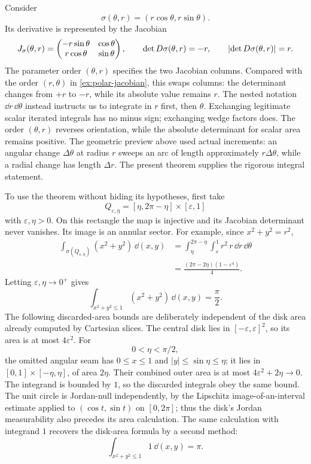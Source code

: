 \begin{example}
Consider
\[
\sigma(\theta,r)=(r\cos\theta,r\sin\theta).
\]
Its derivative is represented by the Jacobian
\[
J_\sigma(\theta,r)=
\begin{pmatrix}
-r\sin\theta&\cos\theta\\
r\cos\theta&\sin\theta
\end{pmatrix},
\qquad
\det D\sigma(\theta,r)=-r,\qquad\lvert \det D\sigma(\theta,r)\rvert=r.
\]
The parameter order $(\theta,r)$ specifies the two Jacobian columns.
Compared with the order $(r,\theta)$ in \cref{ex:polar-jacobian}, this
swaps columns: the determinant changes from $+r$ to $-r$, while its
absolute value remains $r$.
The nested notation $\dd r\,\dd\theta$ instead instructs us to integrate
in $r$ first, then $\theta$. Exchanging legitimate scalar iterated integrals
has no minus sign; exchanging wedge factors does. The order $(\theta,r)$
reverses orientation, while the absolute determinant for scalar area remains positive.
The geometric preview above used actual increments: an angular
change $\Delta\theta$ at radius $r$ sweeps an arc of length approximately
$r\Delta\theta$, while a radial change has length $\Delta r$.
The present theorem supplies the rigorous integral statement.

To use the theorem without hiding its hypotheses, first take
\[
Q_{\varepsilon,\eta}=[\eta,2\pi-\eta]\times[\varepsilon,1]
\]
with $\varepsilon,\eta>0$.  On this rectangle the map is injective and its
Jacobian determinant never vanishes.  Its image is an annular sector.  For example,
since $x^2+y^2=r^2$,
\begin{align*}
\int_{\sigma(Q_{\varepsilon,\eta})}(x^2+y^2)\,\dd(x,y)
&=\int_\eta^{2\pi-\eta}\int_\varepsilon^1r^2\,r\,\dd r\,\dd\theta\\
&=\frac{(2\pi-2\eta)(1-\varepsilon^4)}4.
\end{align*}
Letting $\varepsilon,\eta\to0^+$ gives
\[
\int_{x^2+y^2\leq1}(x^2+y^2)\,\dd(x,y)=\frac\pi2.
\]
The following discarded-area bounds are deliberately independent of the
disk area already computed by Cartesian slices. The central disk lies in $[-\varepsilon,\varepsilon]^2$,
so its area is at most $4\varepsilon^2$. For
\[
0<\eta<\pi/2,
\]
 the omitted
angular seam has $0\leq x\leq1$ and $|y|\leq\sin\eta\leq\eta$;
it lies in $[0,1]\times[-\eta,\eta]$, of area $2\eta$.
Their combined outer area is at most $4\varepsilon^2+2\eta\to0$.
The integrand is bounded by $1$, so the discarded integrals obey the same
bound. The unit circle is Jordan-null independently, by the Lipschitz
image-of-an-interval estimate applied to $(\cos t,\sin t)$ on $[0,2\pi]$;
thus the disk's Jordan measurability also precedes its area calculation.  The
same calculation with integrand $1$ recovers the disk-area formula by a
second method:
\[
\int_{x^2+y^2\leq1}1\,\dd(x,y)=\pi.
\]
\end{example}




